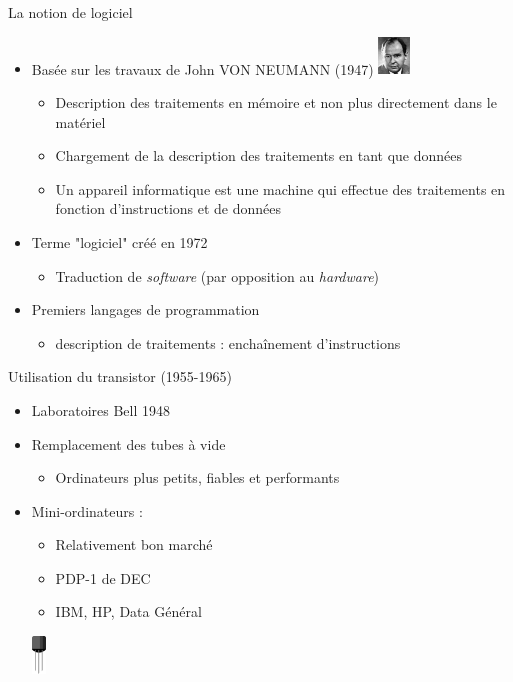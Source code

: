 \begin{frame}{La notion de logiciel \cite{wp-neumann}}
\begin{itemize}
\item Basée sur les travaux de John VON NEUMANN (1947) \includegraphics[height=1cm]{../illustration/JohnvonNeumann-LosAlamos.jpg}
\begin{itemize}
\item Description des traitements en mémoire et non plus directement dans le matériel
\item Chargement de la description des traitements en tant que données
\item Un appareil informatique est une machine qui effectue des traitements en fonction d'instructions et de données
\end{itemize}
\item Terme "logiciel" créé en 1972
\begin{itemize} 
\item Traduction de \textit{software} (par opposition au \textit{hardware})
\end{itemize}
\item Premiers langages de programmation
\begin{itemize}
\item description de traitements : enchaînement d'instructions
\end{itemize}
\end{itemize}

\end{frame}

\begin{frame}{Utilisation du transistor (1955-1965)}
\begin{itemize}
\item Laboratoires Bell 1948
\item Remplacement des tubes à vide
\begin{itemize}
\item Ordinateurs plus petits, fiables et performants
\end{itemize}
\item Mini-ordinateurs :
\begin{itemize}
\item Relativement bon marché
\item PDP-1 de DEC
\item IBM, HP, Data Général
\end{itemize}
	\begin{center}
	\includegraphics[height=1cm,bb=0 0 95 257]{../illustration/transistor.png}
	\end{center}
\end{itemize}
\end{frame}

